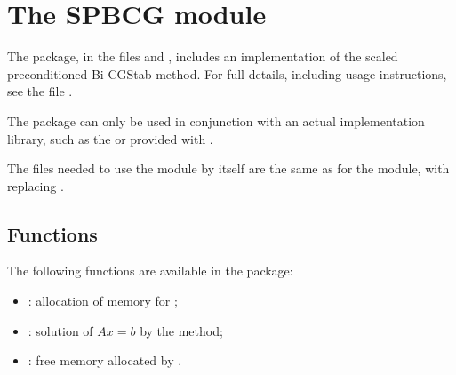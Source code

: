 
\section{The SPBCG module}\label{ss:spbcg}

The {\spbcg} package, in the files  and , includes an
implementation of the scaled preconditioned Bi-CGStab method.  
For full details, including usage instructions, see the file .

{\warn}The {\spbcg} package can only be used in conjunction with an actual {\nvector} 
implementation library, such as the {\nvecs} or {\nvecp} provided with {\sundials}.

The files needed to use the {\spbcg} module by itself are the same as for the
{\spgmr} module, with  replacing .

\subsection{Functions}
The following functions are available in the {\spbcg} package:  
\begin{itemize}
\item {}: allocation of memory for ;
\item {}: solution of $Ax = b$ by the {\spbcg} method;
\item {}: free memory allocated by .
\end{itemize}
